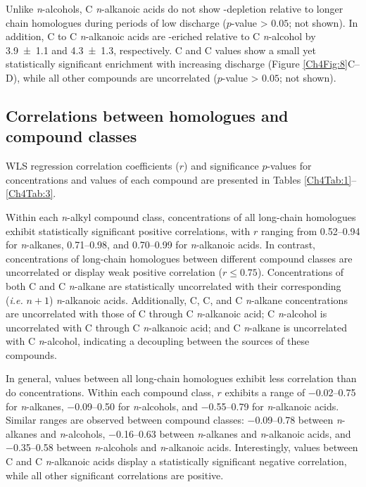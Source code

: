 Unlike \textit{n}-alcohols, C \textit{n}-alkanoic acids do not show -depletion relative to longer chain homologues during periods of low discharge ($p$-value > $0.05$; not shown). In addition, C to C \textit{n}-alkanoic acids are -eriched relative to C \textit{n}-alcohol by \SI{3.9 \pm 1.1}{\permil} and \SI{4.3 \pm 1.3}{\permil}, respectively. C and C  values show a small yet statistically significant enrichment with increasing discharge (Figure \ref{Ch4Fig:8}C--D), while all other compounds are uncorrelated ($p$-value > $0.05$; not shown).

\subsection{Correlations between homologues and compound classes}

WLS regression correlation coefficients ($r$) and significance $p$-values for concentrations and  values of each compound are presented in Tables \ref{Ch4Tab:1}--\ref{Ch4Tab:3}. 

Within each \textit{n}-alkyl compound class, concentrations of all long-chain homologues exhibit statistically significant positive correlations, with $r$ ranging from \numrange{0.52}{0.94} for \textit{n}-alkanes, \numrange{0.71}{0.98}, and \numrange{0.70}{0.99} for \textit{n}-alkanoic acids. In contrast, concentrations of long-chain homologues between different compound classes are uncorrelated or display weak positive correlation ($r \leq 0.75$). Concentrations of both C and C \textit{n}-alkane are statistically uncorrelated with their corresponding (\textit{i.e.} $n + 1$) \textit{n}-alkanoic acids. Additionally, C, C, and C \textit{n}-alkane concentrations are uncorrelated with those of C through C \textit{n}-alkanoic acid; C \textit{n}-alcohol is uncorrelated with C through C \textit{n}-alkanoic acid; and C \textit{n}-alkane is uncorrelated with C \textit{n}-alcohol, indicating a decoupling between the sources of these compounds.

In general,  values between all long-chain homologues exhibit less correlation than do concentrations. Within each compound class, $r$ exhibits a range of \numrange{-0.02}{0.75} for \textit{n}-alkanes, \numrange{-0.09}{0.50} for \textit{n}-alcohols, and \numrange{-0.55}{0.79} for \textit{n}-alkanoic acids. Similar ranges are observed between compound classes: \numrange{-0.09}{0.78} between \textit{n}-alkanes and \textit{n}-alcohols, \numrange{-0.16}{0.63} between \textit{n}-alkanes and \textit{n}-alkanoic acids, and \numrange{-0.35}{0.58} between \textit{n}-alcohols and \textit{n}-alkanoic acids. Interestingly,  values between C and C \textit{n}-alkanoic acids display a statistically significant negative correlation, while all other significant correlations are positive.

